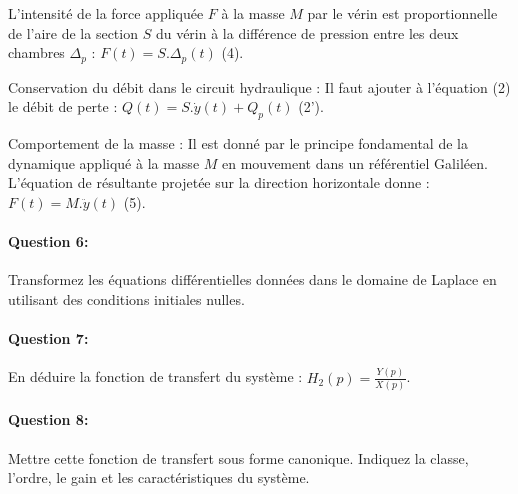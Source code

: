 L'intensité de la force appliquée $F$ à la masse $M$ par le vérin est proportionnelle de l'aire de la section $S$ du vérin à la différence de pression entre les deux chambres $\Delta_p$ : $F(t)=S.\Delta_p(t)$ (4).

Conservation du débit dans le circuit hydraulique : Il faut ajouter à l'équation (2) le débit de perte : $Q(t)=S.\dot{y}(t)+Q_p(t)$ (2').

Comportement de la masse : Il est donné par le principe fondamental de la dynamique appliqué à la masse $M$ en
mouvement dans un référentiel Galiléen. L'équation de résultante projetée sur la direction horizontale donne :
$F(t)=M.\ddot{y}(t)$ (5).

\paragraph{Question 6:} Transformez les équations différentielles données dans le domaine de Laplace en utilisant
des conditions initiales nulles.

\paragraph{Question 7:} En déduire la fonction de transfert du système : $H_2(p)=\frac{Y(p)}{X(p)}$.

\paragraph{Question 8:} Mettre cette fonction de transfert sous forme canonique. Indiquez la classe, l'ordre, le gain et les caractéristiques du système.

